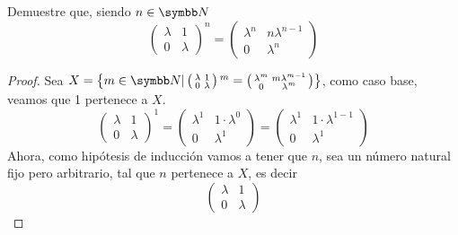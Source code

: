 \item Demuestre que, siendo \(n \in \realN\)
    \[
        \begin{pmatrix}
            \lambda & 1 \\
            0 & \lambda
        \end{pmatrix} ^ {n}
        =
        \begin{pmatrix}
            \lambda^{n} & n\lambda^{n - 1} \\
            0 & \lambda^{n}
        \end{pmatrix}
    \]
    \begin{proof}
        Sea 
        \(
            X = 
            \left\{
                m \in \realN |
                \left(
                \begin{smallmatrix}
                    \lambda & 1 \\
                    0 & \lambda
                \end{smallmatrix} 
                \right){} ^ {m}
                =
                \left(
                \begin{smallmatrix}
                    \lambda^{m} & m\lambda^{m - 1} \\
                    0 & \lambda^{m}
                \end{smallmatrix}
                \right)
            \right\}
        \), como caso base, veamos que 1 pertenece a \(X\).
        \[
            \begin{pmatrix}
                \lambda & 1 \\
                0 & \lambda
            \end{pmatrix} ^ {1}
            =
            \begin{pmatrix}
                \lambda^1 & 1 \cdot \lambda^{0} \\
                0 & \lambda^1
            \end{pmatrix}
            =
            \begin{pmatrix}
                \lambda^1 & 1 \cdot \lambda^{1 - 1} \\
                0 & \lambda^1
            \end{pmatrix}
        \]
        Ahora, como hipótesis de inducción vamos a tener que \(n\), sea un número natural fijo pero arbitrario, tal que
        \(n\) pertenece a \(X\), es decir
        \[
            \begin{pmatrix}
                \lambda & 1 \\
                0 & \lambda

\end{pmatrix}\]
\end{proof}
